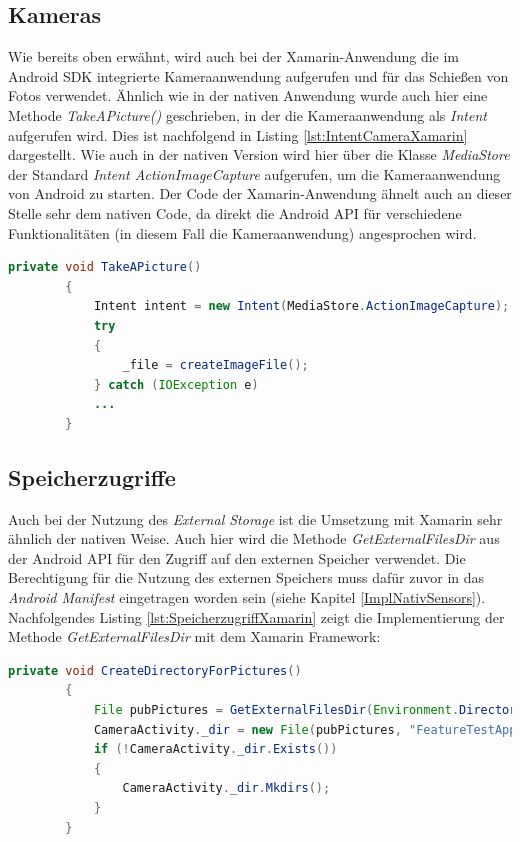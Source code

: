 \subsection*{Kameras}

Wie bereits oben erwähnt, wird auch bei der Xamarin-Anwendung die im Android SDK integrierte Kameraanwendung aufgerufen und für das Schießen von Fotos verwendet. Ähnlich wie in der nativen Anwendung wurde auch hier eine Methode \textit{TakeAPicture()} geschrieben, in der die Kameraanwendung als \textit{Intent} aufgerufen wird. Dies ist nachfolgend in Listing \ref{lst:IntentCameraXamarin} dargestellt. Wie auch in der nativen Version wird hier über die Klasse \textit{MediaStore} der Standard \textit{Intent ActionImageCapture} aufgerufen, um die Kameraanwendung von Android zu starten. Der Code der Xamarin-Anwendung ähnelt auch an dieser Stelle sehr dem nativen Code, da direkt die Android API für verschiedene Funktionalitäten (in diesem Fall die Kameraanwendung) angesprochen wird.
\clearpage 

\begin{lstlisting}[caption=Methode \textit{TakeAPicture()}: Aufruf der Android-Kamerafunktion über einen \textit{Intent} in Xamarin, label=lst:IntentCameraXamarin, language=Java]
private void TakeAPicture()
        {
            Intent intent = new Intent(MediaStore.ActionImageCapture);
            try
            {
                _file = createImageFile();
            } catch (IOException e)
            ...
        }
\end{lstlisting}

\subsection*{Speicherzugriffe}

Auch bei der Nutzung des \textit{External Storage} ist die Umsetzung mit Xamarin sehr ähnlich der nativen Weise. Auch hier wird die Methode \textit{GetExternalFilesDir} aus der Android API für den Zugriff auf den externen Speicher verwendet. Die Berechtigung für die Nutzung des externen Speichers muss dafür zuvor in das \textit{Android Manifest} eingetragen worden sein (siehe Kapitel \ref{ImplNativSensors}). Nachfolgendes Listing \ref{lst:SpeicherzugriffXamarin} zeigt die Implementierung der Methode \textit{GetExternalFilesDir} mit dem Xamarin Framework:

\begin{lstlisting}[caption=Methode \textit{GetExternalFilesDir()}: Adressieren des 'External Storage' und Anlegen eines Ordners für die Fotos der Funktionstest-Anwendung, label=lst:SpeicherzugriffXamarin, language=Java]
private void CreateDirectoryForPictures()
        {
            File pubPictures = GetExternalFilesDir(Environment.DirectoryPictures);
            CameraActivity._dir = new File(pubPictures, "FeatureTestAppXamarin");
            if (!CameraActivity._dir.Exists())
            {
                CameraActivity._dir.Mkdirs();
            }
        }
\end{lstlisting}

